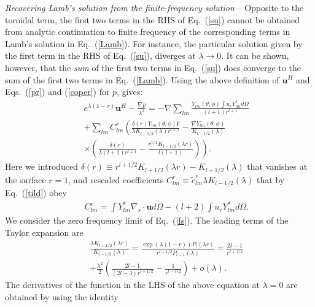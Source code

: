 \documentclass[aps,prx,twocolumn,amsmath,amssymb,amsfonts]{revtex4-2}
\begin{document}
\textit{Recovering Lamb's solution from the finite-frequency solution} -- Opposite to the toroidal term, the first two terms in the RHS of Eq.~(\ref{su}) cannot be obtained from analytic continuation to finite frequency of the corresponding terms in Lamb's solution in Eq.~(\ref{Lamb}). For instance, the particular solution given by the first term in the RHS of Eq.~(\ref{su}), diverges at $\lambda\to 0$. It can be shown, however, that the {\it sum} of the first two terms in Eq.~(\ref{su}) does converge to the sum of the first two terms in Eq.~(\ref{Lamb}). Using the above definition of $\bm u^H$ and Eqs.~(\ref{pr}) and (\ref{coper}) for $p$, gives:
\begin{eqnarray}&&
e^{\lambda (1-r)} \bm u^H\!-\!\frac{\nabla p}{\lambda^2}=-\nabla\sum_{lm}\frac{Y_{lm}(\theta, \phi)\int\! u_r Y_{lm}^* d\Omega}{(l+1)r^{l+1}}
\nonumber\\&&
+\sum_{lm}\! C^{r}_{lm}\left(\frac{\delta(r) Y_{lm}(\theta, \phi)\bm{\hat r}}{\lambda K_{l-1/2}(\lambda)r^{l+2} }-\frac{\nabla Y_{lm}(\theta, \phi)}{K_{l-1/2}(\lambda)}
\right.\nonumber\\&&\left.
\times \left(\frac{\delta(r)}{\lambda (l+1) r^{l+1}}-\frac{r^{1/2}K_{l-1/2}(\lambda r)}{l (l+1)}\right)\right).\label{fs}
\end{eqnarray}
Here we introduced $\delta(r)\equiv r^{l+1/2}K_{l+1/2}(\lambda r)\!-\!K_{l+1/2}(\lambda)$ that vanishes at the surface $r\!=\!1$, and rescaled coefficients $C^r_{lm}\!\equiv\! {\tilde c}^{r}_{lm}\lambda K_{l-1/2}(\lambda)$ that by Eq.~(\ref{tild}) obey
\begin{eqnarray}&&\!\!\!\!\!\!\!\!\!
C^{r}_{lm}\!= \!\int\!\!  Y_{lm}^* \nabla_s\!\cdot\!\bm u d\Omega\!-\!(l\!+\!2)\int\!\! u_r Y_{lm}^* d\Omega. \label{Crl}
\end{eqnarray}
We consider the zero frequency limit of Eq.~(\ref{fs}). The leading terms of the Taylor expansion are
\begin{eqnarray}&&
\frac{\lambda K_{l+1/2}(\lambda r) }{ K_{l-1/2}(\lambda)}=\frac{\exp\left(\lambda (1-r)\right)P_l\left(\lambda r\right)}{r^{l+1/2}P_{l-1}\left(\lambda\right)}
= \frac{2l-1}{r^{l+1/2}}
\nonumber\\&& +\frac{\lambda^2}{2}\left(\frac{2l-1}{(2l-3) r^{l+1/2}}- \frac{1}{r^{l-3/2}}\right)+\mathit{o}(\lambda).
\end{eqnarray}
The derivatives of the function in the LHS of the above equation at $\lambda=0$ are obtained by using the identity
\end{document}
